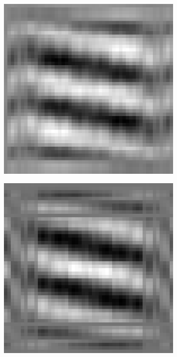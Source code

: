 \begin{figure}[htpb]
\begin{subfigure}{.25\textwidth}
\end{subfigure}%
\begin{subfigure}{.25\textwidth}
\includegraphics[width=1\textwidth]{img/CPSRank1sigma75}
\end{subfigure}%
\begin{subfigure}{.25\textwidth}
\includegraphics[width=1\textwidth]{img/CPSRank1sigma150}

\end{subfigure}
\end{figure}
